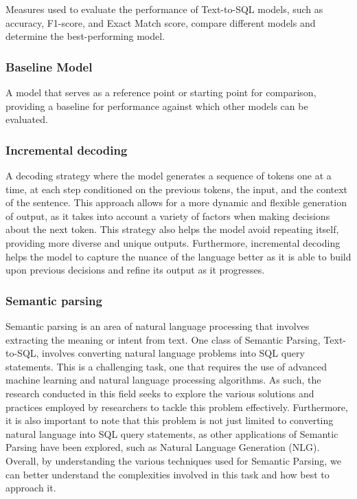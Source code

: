 Measures used to evaluate the performance of Text-to-SQL models, such as accuracy, F1-score, and Exact Match score, compare different models and determine the best-performing model.

\subsubsection{Baseline Model}

A model that serves as a reference point or starting point for comparison, providing a baseline for performance against which other models can be evaluated.

\subsubsection{Incremental decoding}

A decoding strategy where the model generates a sequence of tokens one at a time, at each step conditioned on the previous tokens, the input, and the context of the sentence. This approach allows for a more dynamic and flexible generation of output, as it takes into account a variety of factors when making decisions about the next token. This strategy also helps the model avoid repeating itself, providing more diverse and unique outputs. Furthermore, incremental decoding helps the model to capture the nuance of the language better as it is able to build upon previous decisions and refine its output as it progresses\cite{huang-mi-2010-efficient}.

\subsubsection{Semantic parsing}

Semantic parsing\cite{krishnamurthy-etal-2017-neural} is an area of natural language processing that involves extracting the meaning or intent from text. One class of Semantic Parsing, Text-to-SQL, involves converting natural language problems into SQL query statements. This is a challenging task, one that requires the use of advanced machine learning and natural language processing algorithms. As such, the research conducted in this field seeks to explore the various solutions and practices employed by researchers to tackle this problem effectively. Furthermore, it is also important to note that this problem is not just limited to converting natural language into SQL query statements, as other applications of Semantic Parsing have been explored, such as Natural Language Generation (NLG). Overall, by understanding the various techniques used for Semantic Parsing, we can better understand the complexities involved in this task and how best to approach it.